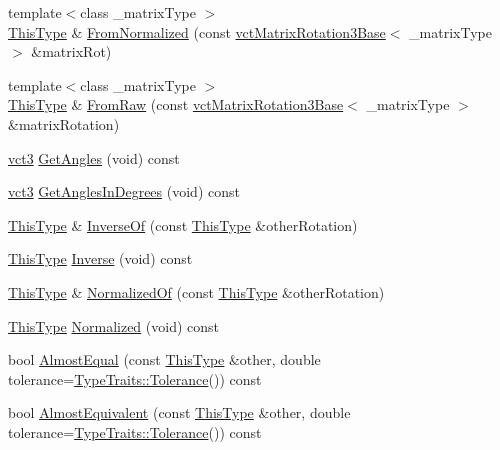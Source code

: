 \begin{DoxyCompactItemize}
\item 
{\footnotesize template$<$class \+\_\+matrix\+Type $>$ }\\\hyperlink{classvct_euler_rotation3}{This\+Type} \& \hyperlink{classvct_euler_rotation3_a0700edaa6d3420093a13ec7123155aa2}{From\+Normalized} (const \hyperlink{classvct_matrix_rotation3_base}{vct\+Matrix\+Rotation3\+Base}$<$ \+\_\+matrix\+Type $>$ \&matrix\+Rot)
\item 
{\footnotesize template$<$class \+\_\+matrix\+Type $>$ }\\\hyperlink{classvct_euler_rotation3}{This\+Type} \& \hyperlink{classvct_euler_rotation3_aee35d05518d231f713cb60cc8de976f1}{From\+Raw} (const \hyperlink{classvct_matrix_rotation3_base}{vct\+Matrix\+Rotation3\+Base}$<$ \+\_\+matrix\+Type $>$ \&matrix\+Rotation)
\item 
\hyperlink{vct_fixed_size_vector_types_8h_a3af82acdbf4eeb73c551909240b106ea}{vct3} \hyperlink{classvct_euler_rotation3_a8b797f4504dd45532ad4f41c1cb989f1}{Get\+Angles} (void) const 
\item 
\hyperlink{vct_fixed_size_vector_types_8h_a3af82acdbf4eeb73c551909240b106ea}{vct3} \hyperlink{classvct_euler_rotation3_acd7395ab5a8cde6afe4dfcc232a8fbe3}{Get\+Angles\+In\+Degrees} (void) const 
\item 
\hyperlink{classvct_euler_rotation3}{This\+Type} \& \hyperlink{classvct_euler_rotation3_a5877dde2e9ef151fcadce173cd6ae9fb}{Inverse\+Of} (const \hyperlink{classvct_euler_rotation3}{This\+Type} \&other\+Rotation)
\item 
\hyperlink{classvct_euler_rotation3}{This\+Type} \hyperlink{classvct_euler_rotation3_af93edc89a2acfc24d0c9f74ff366f8e5}{Inverse} (void) const 
\item 
\hyperlink{classvct_euler_rotation3}{This\+Type} \& \hyperlink{classvct_euler_rotation3_a716f3e35b256b78ab4339248833dce37}{Normalized\+Of} (const \hyperlink{classvct_euler_rotation3}{This\+Type} \&other\+Rotation)
\item 
\hyperlink{classvct_euler_rotation3}{This\+Type} \hyperlink{classvct_euler_rotation3_a4673862f5a07020edadedf0e054a0b8a}{Normalized} (void) const 
\item 
bool \hyperlink{classvct_euler_rotation3_a4525b17d3de059cca190420b9de4ad34}{Almost\+Equal} (const \hyperlink{classvct_euler_rotation3}{This\+Type} \&other, double tolerance=\hyperlink{classcmn_type_traits_adc129bf9867295b90d300768b780fa99}{Type\+Traits\+::\+Tolerance}()) const 
\item 
bool \hyperlink{classvct_euler_rotation3_aac1da2a6b1cec3f9032bae6886f6aeff}{Almost\+Equivalent} (const \hyperlink{classvct_euler_rotation3}{This\+Type} \&other, double tolerance=\hyperlink{classcmn_type_traits_adc129bf9867295b90d300768b780fa99}{Type\+Traits\+::\+Tolerance}()) const 

\end{DoxyCompactItemize}
